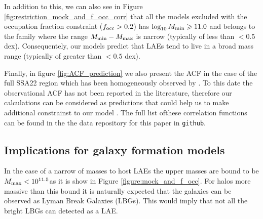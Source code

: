 \documentclass[usenatbib]{mn2e}
\newcommand{\hMsun}{{\ifmmode{h^{-1}{\rm {M_{\odot}}}}\else{$h^{-1}{\rm{M_{\odot}}}$}\fi}}
\begin{document}
In addition to this, we can also see in Figure \ref{fig:restriction_mock_and_f_occ_corr}
 that all the models excluded with  the occupation fraction  constraint ($f_{\rm occ}>0.2$)
 has $\log_{10}M_{\rm min}\geq 11.0$ and  belongs to the family 
where the range $M_{\rm min}-M_{\rm max}$ is narrow (typically of less than $<0.5$ dex).
Consequentely, our models predict that LAEs tend to live in a broad mass range
(typically of greater than $<0.5$ dex).





Finally, in figure \ref{fig:ACF_prediction} we also present the ACF 
in the case of the full SSA22 region which has been homogeneously
observed by \citep{Yamada2012}. To
this date the observational ACF has not been reported in the
litereature, therefore our calculations can be considered as
predictions that could help us to make additional constrainst to our model
. The full list ofthese correlation functions can
be found in the the data repository for this paper in \verb"github". 




% 



\subsection{Implications for galaxy formation models}

In the case of a narrow of masses to host LAEs the upper masses are
bound to be $M_{\rm max}< 10^{11.5}$\hMsun as it is show in Figure
\ref{figure:mock_and_f_occ}. For halos more massive than this bound it
is naturally expected that the galaxies can be observed as Lyman Break
Galaxies (LBGs). This would imply that not all the bright LBGs can
detected as a LAE.
\end{document}
